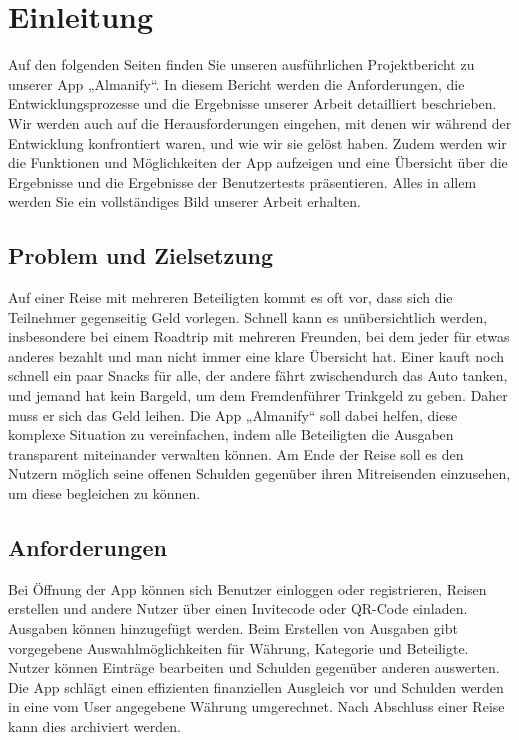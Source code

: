 \section{ Einleitung}

Auf den folgenden Seiten finden Sie unseren ausführlichen Projektbericht zu unserer App „Almanify“. In diesem Bericht werden die Anforderungen, die Entwicklungsprozesse und die Ergebnisse unserer Arbeit detailliert beschrieben. Wir werden auch auf die Herausforderungen eingehen, mit denen wir während der Entwicklung konfrontiert waren, und wie wir sie gelöst haben. Zudem werden wir die Funktionen und Möglichkeiten der App aufzeigen und eine Übersicht über die Ergebnisse und die Ergebnisse der Benutzertests präsentieren. Alles in allem werden Sie ein vollständiges Bild unserer Arbeit erhalten.

\subsection{ Problem und Zielsetzung}

Auf einer Reise mit mehreren Beteiligten kommt es oft vor, dass sich die Teilnehmer gegenseitig Geld vorlegen. Schnell kann es unübersichtlich werden, insbesondere bei einem Roadtrip mit mehreren Freunden, bei dem jeder für etwas anderes bezahlt und man nicht immer eine klare Übersicht hat. Einer kauft noch schnell ein paar Snacks für alle, der andere fährt zwischendurch das Auto tanken, und jemand hat kein Bargeld, um dem Fremdenführer Trinkgeld zu geben. Daher muss er sich das Geld leihen. Die App „Almanify“ soll dabei helfen, diese komplexe Situation zu vereinfachen, indem alle Beteiligten die Ausgaben transparent miteinander verwalten können. Am Ende der Reise soll es den Nutzern möglich seine offenen Schulden gegenüber ihren Mitreisenden einzusehen, um diese begleichen zu können.

\subsection{Anforderungen}

Bei Öffnung der App können sich Benutzer einloggen oder registrieren, Reisen erstellen und andere Nutzer über einen Invitecode oder QR-Code einladen. Ausgaben können hinzugefügt werden. Beim Erstellen von Ausgaben gibt vorgegebene Auswahlmöglichkeiten für Währung, Kategorie und Beteiligte. Nutzer können Einträge bearbeiten und Schulden gegenüber anderen auswerten. Die App schlägt einen effizienten finanziellen Ausgleich vor und Schulden werden in eine vom User angegebene Währung umgerechnet. Nach Abschluss einer Reise kann dies archiviert werden.

